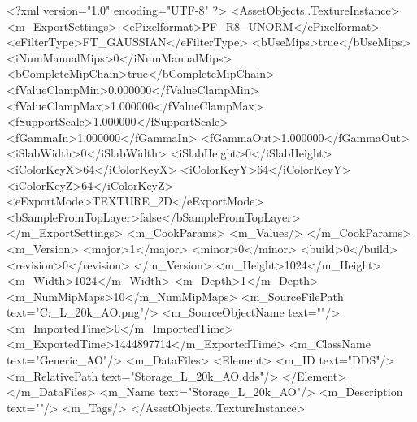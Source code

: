 <?xml version="1.0" encoding="UTF-8" ?>
<AssetObjects..TextureInstance>
	<m_ExportSettings>
		<ePixelformat>PF_R8_UNORM</ePixelformat>
		<eFilterType>FT_GAUSSIAN</eFilterType>
		<bUseMips>true</bUseMips>
		<iNumManualMips>0</iNumManualMips>
		<bCompleteMipChain>true</bCompleteMipChain>
		<fValueClampMin>0.000000</fValueClampMin>
		<fValueClampMax>1.000000</fValueClampMax>
		<fSupportScale>1.000000</fSupportScale>
		<fGammaIn>1.000000</fGammaIn>
		<fGammaOut>1.000000</fGammaOut>
		<iSlabWidth>0</iSlabWidth>
		<iSlabHeight>0</iSlabHeight>
		<iColorKeyX>64</iColorKeyX>
		<iColorKeyY>64</iColorKeyY>
		<iColorKeyZ>64</iColorKeyZ>
		<eExportMode>TEXTURE_2D</eExportMode>
		<bSampleFromTopLayer>false</bSampleFromTopLayer>
	</m_ExportSettings>
	<m_CookParams>
		<m_Values/>
	</m_CookParams>
	<m_Version>
		<major>1</major>
		<minor>0</minor>
		<build>0</build>
		<revision>0</revision>
	</m_Version>
	<m_Height>1024</m_Height>
	<m_Width>1024</m_Width>
	<m_Depth>1</m_Depth>
	<m_NumMipMaps>10</m_NumMipMaps>
	<m_SourceFilePath text="C:\Users\Shadow\Desktop\Prototypes\Storage_L_20k_AO.png"/>
	<m_SourceObjectName text=""/>
	<m_ImportedTime>0</m_ImportedTime>
	<m_ExportedTime>1444897714</m_ExportedTime>
	<m_ClassName text="Generic_AO"/>
	<m_DataFiles>
		<Element>
			<m_ID text="DDS"/>
			<m_RelativePath text="Storage_L_20k_AO.dds"/>
		</Element>
	</m_DataFiles>
	<m_Name text="Storage_L_20k_AO"/>
	<m_Description text=""/>
	<m_Tags/>
</AssetObjects..TextureInstance>

